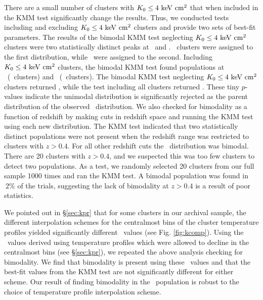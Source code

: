\documentclass[12pt,preprint]{aastex}
\begin{document}
There are a small number of clusters with $K_0 \le 4 \mathrm{\mbox{\ensuremath{\mathrm{~keV}}} \mathrm{\mbox{\ensuremath{\mathrm{~cm}}}^2}}$ that when
included in the KMM test significantly change the results. Thus, we
conducted tests including and excluding $K_0 \le 4 \mathrm{\mbox{\ensuremath{\mathrm{~keV}}} \mathrm{\mbox{\ensuremath{\mathrm{~cm}}}^2}}$ clusters and
provide two sets of best-fit parameters. The results of the bimodal
KMM test neglecting $K_0 \le 4 \mathrm{\mbox{\ensuremath{\mathrm{~keV}}} \mathrm{\mbox{\ensuremath{\mathrm{~cm}}}^2}}$ clusters were two statistically
distinct peaks at \kmma\ and \kmmb. \kmmc\ clusters were assigned to
the first distribution, while \kmmd\ were assigned to the
second. Including $K_0 \le 4 \mathrm{\mbox{\ensuremath{\mathrm{~keV}}} \mathrm{\mbox{\ensuremath{\mathrm{~cm}}}^2}}$ clusters, the bimodal KMM test
found populations at \kmmf\ (\kmmh\ clusters) and
\kmmg\ (\kmmi\ clusters). The bimodal KMM test neglecting $K_0 \le 4
\mathrm{\mbox{\ensuremath{\mathrm{~keV}}} \mathrm{\mbox{\ensuremath{\mathrm{~cm}}}^2}}$ clusters returned \kmme, while the test including all clusters
returned \kmmj. These tiny $p$-values indicate the unimodal
distribution is significantly rejected as the parent distribution of
the observed \kna\ distribution. We also checked for bimodality as a
function of redshift by making cuts in redshift space and running the
KMM test using each new distribution. The KMM test indicated that two
statistically distinct populations were not present when the redshift
range was restricted to clusters with $z > 0.4$. For all other
redshift cuts the \kna\ distribution was bimodal. There are 20
clusters with $z > 0.4$, and we suspected this was too few clusters to
detect two populations. As a test, we randomly selected 20 clusters
from our full sample 1000 times and ran the KMM test. A bimodal
population was found in $~2\%$ of the trials, suggesting the lack of
bimodality at $z > 0.4$ is a result of poor statistics.

We pointed out in \S\ref{sec:kpr} that for some clusters in our
archival sample, the different interpolation schemes for the
centralmost bins of the cluster temperature profiles yielded
significantly different \kna\ values (see Fig. \ref{fig:kcomp}). Using
the \kna\ values derived using temperature profiles which were allowed
to decline in the centralmost bins (see \S\ref{sec:kpr}), we repeated
the above analysis checking for bimodality. We find that bimodality is
present using these \kna\ values and that the best-fit values from the
KMM test are not significantly different for either scheme. Our result
of finding bimodality in the \kna\ population is robust to the choice
of temperature profile interpolation scheme.
\end{document}
